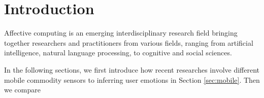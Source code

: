 \section{Introduction}

Affective computing is an emerging interdisciplinary research field bringing together researchers and practitioners from various fields, ranging from artificial intelligence, natural language processing, to cognitive and social sciences.




\cite{Politou2017, Garcia-Garcia2017}

In the following sections, we first introduce how recent researches involve different mobile commodity sensors
to inferring user emotions in Section \ref{sec:mobile}. 
Then we compare 
